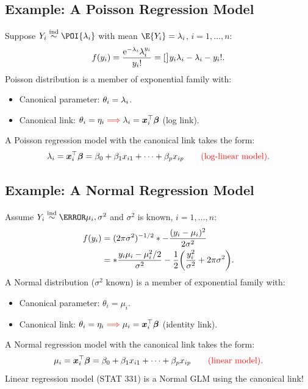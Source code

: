 \documentclass{article}\usepackage[]{graphicx}\usepackage[svgnames]{xcolor}
\let\exp\relax%
\let\log\relax%
\newcommand{\ind}{\overset{\text{ind}}{\sim}}%
\providecommand{\Vector}[1]{\bm{#1}}%
\begin{document}
\subsection*{Example: A Poisson Regression Model}
Suppose $ Y_i \ind\POI{\lambda_i} $ with mean $ \E{Y_i}=\lambda_i $, $ i=1,\ldots,n $:
\[ f(y_i)=\frac{\mathrm{e}^{-\lambda_i}\lambda_i^{y_i}}{y_i!}=\exp[\big]{y_i\log{\lambda_i}-\lambda_i-\log{y_i!}}.  \]
Poisson distribution is a member of exponential family with:
\begin{itemize}
    \item Canonical parameter: $ \theta_i=\log{\lambda_i} $.
    \item Canonical link: $ \theta_i=\eta_i\textcolor{Red}{\implies}\log{\lambda_i}=\Vector{x}_i^\top \Vector{\beta} $ (log link).
\end{itemize}
A Poisson regression model with the canonical link takes the form:
\[ \log{\lambda_i}=\Vector{x}_i^\top \Vector{\beta}=\beta_0+\beta_1x_{i1}+\cdots+\beta_p x_{ip}\qquad \text{\textcolor{Red}{(log-linear model)}}. \]
\subsection*{Example: A Normal Regression Model}
Assume $ Y_i \ind \N{\mu_i,\sigma^2} $ and $ \sigma^2 $ is known, $ i=1,\ldots,n $:
\begin{align*}
    f(y_i)
     & =(2\pi\sigma^2)^{-1/2}\exp*{-\frac{(y_i-\mu_i)^2}{2\sigma^2}}                                                   \\
     & =\exp*{\frac{y_i\mu_i-\mu_i^2/2}{\sigma^2}-\frac{1}{2}\biggl(\frac{y_i^2}{\sigma^2}+\log{2\pi\sigma^2}\biggr)}.
\end{align*}
A Normal distribution ($ \sigma^2 $ known) is a member of exponential family with:
\begin{itemize}
    \item Canonical parameter: $ \theta_i=\mu_i $.
    \item Canonical link: $ \theta_i=\eta_i \textcolor{Red}{\implies}\mu_i=\Vector{x}_i^\top \Vector{\beta} $ (identity link).
\end{itemize}
A Normal regression model with the canonical link takes the form:
\[ \mu_i=\Vector{x}_i^\top \Vector{\beta}=\beta_0+\beta_1x_{i1}+\cdots+\beta_p x_{ip}\qquad \text{\textcolor{Red}{(linear model)}}. \]
Linear regression model (STAT 331) is a Normal GLM using the canonical link!
\end{document}
